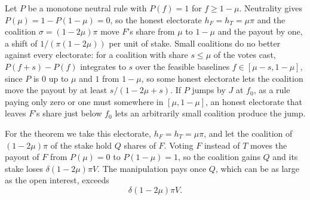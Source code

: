 \documentclass[conference,compsoc]{IEEEtran}
\newcommand{\muparam}{\mu}
\newcommand{\hF}{h_{F}}
\newcommand{\hT}{h_{T}}
\begin{document}
\begin{IEEEproof}
 Let $P$ be a monotone neutral rule with $P(f) = 1$ for $f \ge 1 - \muparam$. Neutrality gives $P(\muparam) = 1 - P(1 - \muparam) = 0$, so the honest electorate $\hF = \hT = \muparam\pi$ and the coalition $\sigma = (1 - 2\muparam)\pi$ move $F$'s share from $\muparam$ to $1 - \muparam$ and the payout by one, a shift of $1/(\pi(1-2\muparam))$ per unit of stake. Small coalitions do no better against every electorate: for a coalition with share $s \le \muparam$ of the votes cast, $P(f + s) - P(f)$ integrates to $s$ over the feasible baselines $f \in [\muparam - s, 1 - \muparam]$, since $P$ is $0$ up to $\muparam$ and $1$ from $1 - \muparam$, so some honest electorate lets the coalition move the payout by at least $s/(1 - 2\muparam + s)$. If $P$ jumps by $J$ at $f_0$, as a rule paying only zero or one must somewhere in $[\muparam, 1 - \muparam]$, an honest electorate that leaves $F$'s share just below $f_0$ lets an arbitrarily small coalition produce the jump.

 For the theorem we take this electorate, $\hF = \hT = \muparam\pi$, and let the coalition of $(1 - 2\muparam)\pi$ of the stake hold $Q$ shares of $F$. Voting $F$ instead of $T$ moves the payout of $F$ from $P(\muparam) = 0$ to $P(1 - \muparam) = 1$, so the coalition gains $Q$ and its stake loses $\delta(1 - 2\muparam)\pi V$. The manipulation pays once $Q$, which can be as large as the open interest, exceeds
\[
\delta(1 - 2\muparam)\pi V .
\]
\end{IEEEproof}
\end{document}
